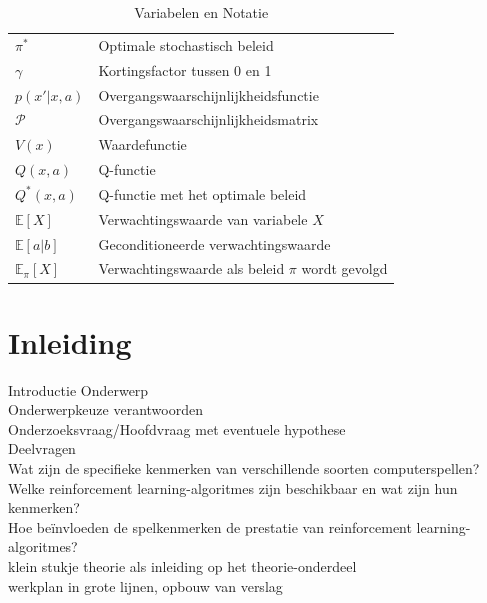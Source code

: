 \documentclass[a4paper,12pt]{article}
\begin{document}
\begin{table}[h]
\begin{tabular}{>{\raggedright}p{3cm} >{\raggedright\arraybackslash}p{10cm}}
        $\pi^*$                     & Optimale stochastisch beleid                      \\
        $\gamma$                    & Kortingsfactor tussen 0 en 1                      \\
        $p(x'|x, a)$                & Overgangswaarschijnlijkheidsfunctie               \\
        $\mathcal{P}$               & Overgangswaarschijnlijkheidsmatrix                \\
        $V(x)$                      & Waardefunctie                                     \\
        $Q(x, a)$                   & Q-functie                                         \\
        $Q^*(x, a)$                 & Q-functie met het optimale beleid                 \\
        $\mathbb{E}[X]$             & Verwachtingswaarde van variabele $X$              \\
        $\mathbb{E}[a|b]$           & Geconditioneerde verwachtingswaarde               \\
        $\mathbb{E}_{\pi}[X]$       & Verwachtingswaarde als beleid $\pi$ wordt gevolgd \\
    \end{tabular}
    \caption{Variabelen en Notatie}
\end{table}

\newpage
\tableofcontents

\newpage
\section{Inleiding}
Introductie Onderwerp \\ Onderwerpkeuze verantwoorden \\
Onderzoeksvraag/Hoofdvraag met eventuele hypothese \\ Deelvragen \\ Wat zijn de
specifieke kenmerken van verschillende soorten computerspellen? \\ Welke
reinforcement learning-algoritmes zijn beschikbaar en wat zijn hun kenmerken?
\\ Hoe beïnvloeden de spelkenmerken de prestatie van reinforcement
learning-algoritmes? \\ klein stukje theorie als inleiding op het
theorie-onderdeel \\ werkplan in grote lijnen, opbouw van verslag \\
\end{document}
